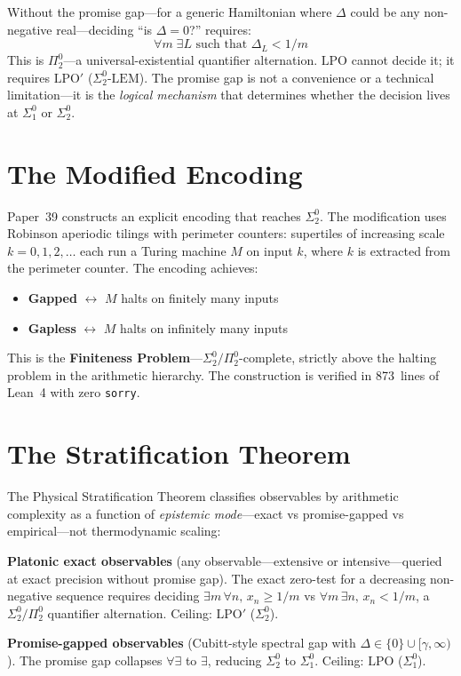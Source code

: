 \documentclass[11pt,a4paper]{report}
\theoremstyle{plain}
\theoremstyle{definition}
\theoremstyle{remark}
\newcommand{\LPO}{\mathrm{LPO}}
\newcommand{\LEM}{\mathrm{LEM}}
\begin{document}
Without the promise gap---for a generic Hamiltonian where $\Delta$ could be any non-negative real---deciding ``is $\Delta = 0$?'' requires:
\[
  \forall m\;\exists L \text{ such that } \Delta_L < 1/m
\]
This is $\Pi^0_2$---a universal-existential quantifier alternation. $\LPO$ cannot decide it; it requires $\LPO'$ ($\Sigma^0_2$-$\LEM$). The promise gap is not a convenience or a technical limitation---it is the \emph{logical mechanism} that determines whether the decision lives at $\Sigma^0_1$ or $\Sigma^0_2$.

\section{The Modified Encoding}

Paper~39 constructs an explicit encoding that reaches $\Sigma^0_2$. The modification uses Robinson aperiodic tilings with perimeter counters: supertiles of increasing scale $k = 0, 1, 2, \ldots$ each run a Turing machine $M$ on input $k$, where $k$ is extracted from the perimeter counter. The encoding achieves:
\begin{itemize}[nosep]
\item \textbf{Gapped} $\longleftrightarrow$ $M$ halts on finitely many inputs
\item \textbf{Gapless} $\longleftrightarrow$ $M$ halts on infinitely many inputs
\end{itemize}
This is the \textbf{Finiteness Problem}---$\Sigma^0_2/\Pi^0_2$-complete, strictly above the halting problem in the arithmetic hierarchy. The construction is verified in 873~lines of Lean~4 with zero \texttt{sorry}.

\section{The Stratification Theorem}

The Physical Stratification Theorem classifies observables by arithmetic complexity as a function of \emph{epistemic mode}---exact vs promise-gapped vs empirical---not thermodynamic scaling:

\textbf{Platonic exact observables} (any observable---extensive or intensive---queried at exact precision without promise gap). The exact zero-test for a decreasing non-negative sequence requires deciding $\exists m\,\forall n,\, x_n \geq 1/m$ vs $\forall m\,\exists n,\, x_n < 1/m$, a $\Sigma^0_2/\Pi^0_2$ quantifier alternation. Ceiling: $\LPO'$ ($\Sigma^0_2$).

\textbf{Promise-gapped observables} (Cubitt-style spectral gap with $\Delta \in \{0\}\cup[\gamma,\infty)$). The promise gap collapses $\forall\exists$ to $\exists$, reducing $\Sigma^0_2$ to $\Sigma^0_1$. Ceiling: $\LPO$ ($\Sigma^0_1$).
\end{document}
